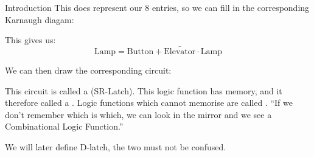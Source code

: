 \documentclass[a4paper]{article}
\begin{document}
\begin{parag}{Introduction}
    This does represent our 8 entries, so we can fill in the corresponding Karnaugh diagam:

    This gives us: 
    \[\text{Lamp} = \text{Button} + \bar{\text{Elevator}} \cdot \text{Lamp}\]
    
    We can then draw the corresponding circuit:

    This circuit is called a  (SR-Latch). This logic function has memory, and it therefore called a . Logic functions which cannot memorise are called . ``If we don't remember which is which, we can look in the mirror and we see a Combinational Logic Function.''

    We will later define D-latch, the two must not be confused.
\end{parag}
\end{document}
